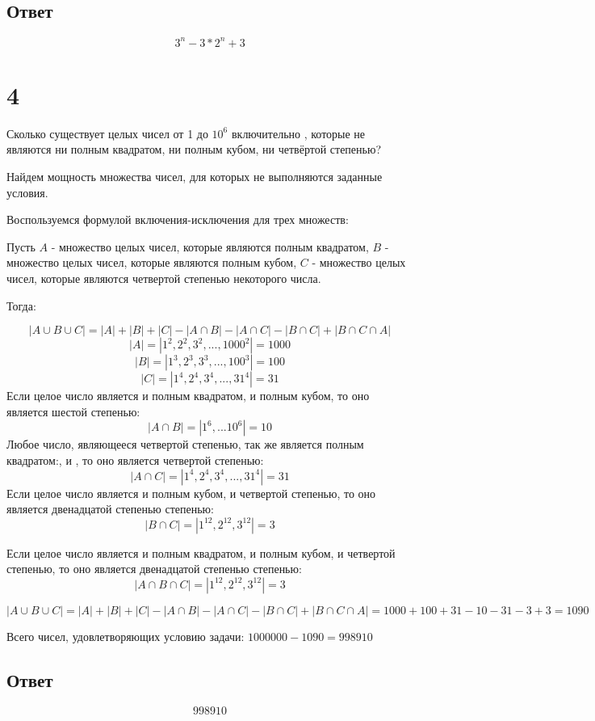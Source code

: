 \documentclass[a4paper]{article}
\begin{document}
\subsection*{Ответ}
$$3^n - 3 * 2^n + 3$$


\section*{4}

Сколько существует целых чисел от 1 до $10^6$ $ \textbf{включительно}$ , которые не являются ни полным квадратом, ни полным кубом, ни четвёртой степенью?

Найдем мощность множества чисел, для которых не выполняются заданные условия.

Воспользуемся формулой включения-исключения для трех множеств:

Пусть $A$  - множество целых чисел, которые являются полным квадратом, $B$  - множество целых чисел, которые являются полным кубом, $C$  - множество целых чисел, которые являются четвертой степенью некоторого числа.

Тогда:

$$|A \cup B \cup C| = |A| + |B| + |C| - |A \cap B| - |A \cap C| - |B \cap C| + |B \cap C \cap A| $$
$$|A| =  |{1^2, 2^2, 3^2, ..., 1000^2}| = 1000 $$
$$|B| =  |{1^3, 2^3, 3^3, ..., 100^3}| = 100 $$
$$|C| =  |{1^4, 2^4, 3^4, ..., 31^4}| = 31 $$
Если целое число является и полным квадратом, и полным кубом, то оно является шестой степенью:
$$|A \cap B| = |{1^6, ... 10^6}| = 10$$
Любое число, являющееся четвертой степенью, так же является полным квадратом:, и , то оно является четвертой степенью:
$$|A \cap C| = |{1^4, 2^4, 3^4, ..., 31^4}| = 31$$
Если целое число является и полным кубом, и четвертой степенью, то оно является двенадцатой степенью степенью:
$$|B \cap C| = |{1^{12}, 2^{12}, 3^{12}}| = 3$$

Если целое число является и полным квадратом, и полным кубом, и четвертой степенью, то оно является двенадцатой степенью степенью:
$$|A \cap B \cap C| = |{1^{12}, 2^{12}, 3^{12}}| = 3$$

$$|A \cup B \cup C| = |A| + |B| + |C| - |A \cap B| - |A \cap C| - |B \cap C| + |B \cap C \cap A|  = 1000 + 100 + 31 - 10 - 31 -3 + 3 = 1090$$

Всего чисел, удовлетворяющих условию задачи: $1000000 - 1090 = 998910$

\subsection*{Ответ}
$$998910$$
\end{document}
